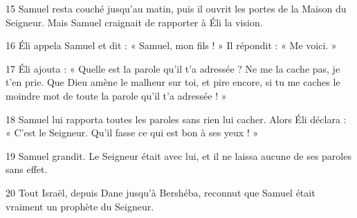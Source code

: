
15 Samuel resta couché jusqu’au matin, puis il ouvrit les portes de la Maison du Seigneur. Mais Samuel craignait de rapporter à Éli la vision.

16 Éli appela Samuel et dit : « Samuel, mon fils ! » Il répondit : « Me voici. »

17 Éli ajouta : « Quelle est la parole qu’il t’a adressée ? Ne me la cache pas, je t’en prie. Que Dieu amène le malheur sur toi, et pire encore, si tu me caches le moindre mot de toute la parole qu’il t’a adressée ! »

18 Samuel lui rapporta toutes les paroles sans rien lui cacher. Alors Éli déclara : « C’est le Seigneur. Qu’il fasse ce qui est bon à ses yeux ! »

19 Samuel grandit. Le Seigneur était avec lui, et il ne laissa aucune de ses paroles sans effet.

20 Tout Israël, depuis Dane jusqu’à Bershéba, reconnut que Samuel était vraiment un prophète du Seigneur.
